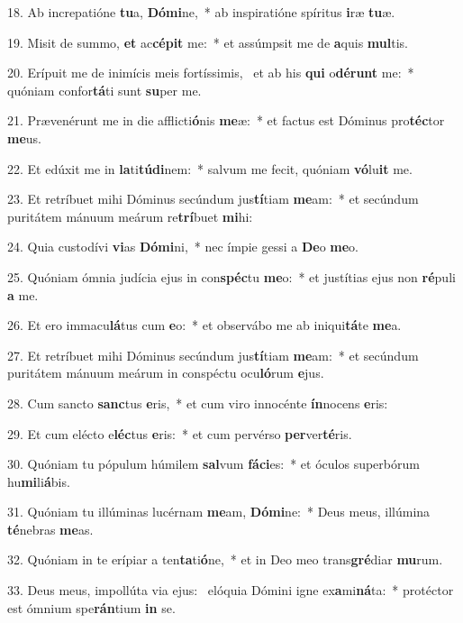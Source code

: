 18. Ab increpatióne \textbf{tu}a, \textbf{Dó}\textbf{mi}ne,~*  ab inspiratióne spíritus \textbf{i}ræ \textbf{tu}æ.\

19. Misit de summo, \textbf{et} ac\textbf{cé}\textbf{pit} me:~*  et assúmpsit me de \textbf{a}quis \textbf{mul}tis.\

20. Erípuit me de inimícis meis fortíssimis, \dag\  et ab his \textbf{qui} o\textbf{dé}\textbf{runt} me:~*  quóniam confor\textbf{tá}ti sunt \textbf{su}per me.\

21. Prævenérunt me in die afflicti\textbf{ó}nis \textbf{me}æ:~*  et factus est Dóminus pro\textbf{téc}tor \textbf{me}us.\

22. Et edúxit me in \textbf{la}ti\textbf{tú}\textbf{di}nem:~*  salvum me fecit, quóniam \textbf{vó}lu\textbf{it} me.\

23. Et retríbuet mihi Dóminus secúndum jus\textbf{tí}tiam \textbf{me}am:~*  et secúndum puritátem mánuum meárum re\textbf{trí}buet \textbf{mi}hi:\

24. Quia custodívi \textbf{vi}as \textbf{Dó}\textbf{mi}ni,~*  nec ímpie gessi a \textbf{De}o \textbf{me}o.\

25. Quóniam ómnia judícia ejus in con\textbf{spéc}tu \textbf{me}o:~*  et justítias ejus non \textbf{ré}puli \textbf{a} me.\

26. Et ero immacu\textbf{lá}tus cum \textbf{e}o:~*  et observábo me ab iniqui\textbf{tá}te \textbf{me}a.\

27. Et retríbuet mihi Dóminus secúndum jus\textbf{tí}tiam \textbf{me}am:~*  et secúndum puritátem mánuum meárum in conspéctu ocu\textbf{ló}rum \textbf{e}jus.\

28. Cum sancto \textbf{sanc}tus \textbf{e}ris,~*  et cum viro innocénte \textbf{ín}nocens \textbf{e}ris:\

29. Et cum elécto e\textbf{léc}tus \textbf{e}ris:~*  et cum pervérso \textbf{per}ver\textbf{té}ris.\

30. Quóniam tu pópulum húmilem \textbf{sal}vum \textbf{fá}\textbf{ci}es:~*  et óculos superbórum hu\textbf{mi}li\textbf{á}bis.\

31. Quóniam tu illúminas lucérnam \textbf{me}am, \textbf{Dó}\textbf{mi}ne:~*  Deus meus, illúmina \textbf{té}nebras \textbf{me}as.\

32. Quóniam in te erípiar a ten\textbf{ta}ti\textbf{ó}ne,~*  et in Deo meo trans\textbf{gré}diar \textbf{mu}rum.\

33. Deus meus, impollúta via ejus: \dag\  elóquia Dómini igne ex\textbf{a}mi\textbf{ná}ta:~*  protéctor est ómnium spe\textbf{rán}tium \textbf{in} se.\

